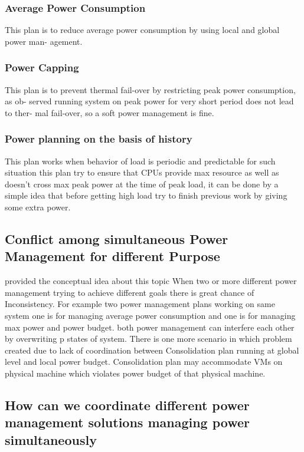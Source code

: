 \documentclass[seminar,twoside]{iitbreport}
\begin{document}
\subsubsection{Average Power Consumption}
This plan is to reduce average power consumption by using local and global power man-
agement.
\subsubsection{Power Capping}
This plan is to prevent thermal fail-over by restricting peak power consumption, as ob-
served running system on peak power for very short period does not lead to ther-
mal fail-over, so a soft power management is fine.
\subsubsection{Power planning on the basis of history}
This plan works when behavior of load is periodic and predictable for such situation this plan try to ensure that CPUs
provide max resource as well as doesn't cross max peak power at the time of peak load, it can be done by a simple idea that 
before getting high load try to finish previous work by giving some extra power.
\subsection{Conflict among simultaneous Power Management for different Purpose}
\cite{nostruggle} provided the conceptual idea about this topic
When two or more different power management trying to achieve different goals there is great chance of Inconsistency.
For example two power management plans working on same system one is for managing average power consumption and one is for managing
max power and power budget.
both power management can interfere each other by overwriting p states of system.
There is one more scenario in which problem created due to lack of coordination between Consolidation plan running at global level and
local power budget. Consolidation plan may accommodate VMs on physical machine which violates power budget of that physical machine. 
\subsection{How can we coordinate different power management solutions managing power simultaneously}
\end{document}
